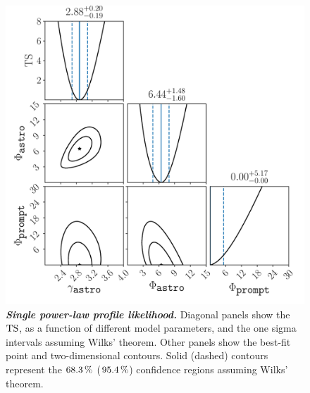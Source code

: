 \begin{figure}
	\centering
	\includegraphics[width=\linewidth]{figures/hese_paper/freq_corner}
	\internallinenumbers
	\caption{\textbf{\textit{Single power-law profile likelihood.}}
		Diagonal panels show the $\mathrm{TS}$, as a function of different model parameters, and the one sigma intervals assuming Wilks' theorem.
		Other panels show the best-fit point and two-dimensional contours.
		Solid (dashed) contours represent the $\SI{68.3}\percent$ ($\SI{95.4}\percent$) confidence regions assuming Wilks' theorem.}\label{fig:SPL_profile}
\end{figure}

